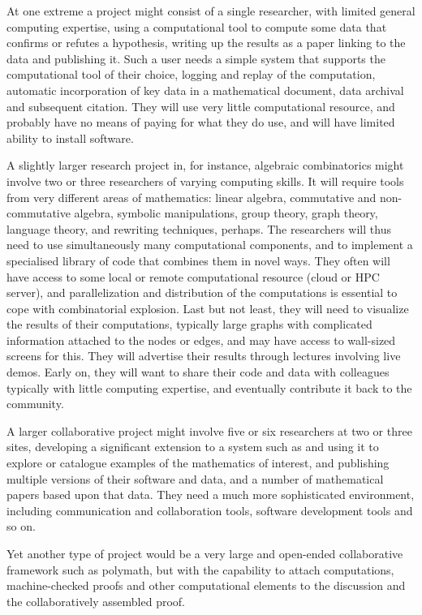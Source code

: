 \begin{compactitem}
\item At one extreme a project might consist of a single researcher, with limited
  general computing expertise, using a computational tool to compute some data
  that confirms or refutes a hypothesis, writing up the results as a paper
  linking to the data and publishing it. Such a user needs a simple system
  that supports the computational tool of their choice, logging and replay of
  the computation, automatic incorporation of key data in a mathematical
  document, data archival and subsequent citation. They will use very little
  computational resource, and probably have no means of paying for what they
  do use, and will have limited ability to install software.

\item A slightly larger research project in, for instance, algebraic
  combinatorics might involve
  two or three researchers of varying computing skills. It will
  require tools from very different areas of mathematics:
  linear algebra, commutative and non-commutative algebra, symbolic
  manipulations, group theory, graph theory, language theory, and
  rewriting techniques, perhaps. The researchers will thus need to use simultaneously many
  computational components, and to implement a specialised library of code
  that combines them in novel ways. They often will have access to
  some local or remote computational resource (cloud or HPC server),
  and parallelization and distribution of the computations is
  essential to cope with combinatorial explosion. Last but not
  least, they will need to visualize the results of their computations,
 typically large graphs
  with complicated information attached to the nodes or edges, and may have
  access to wall-sized screens for this. They will advertise their
  results through lectures involving live demos. Early on, they will
  want to share their code and data with colleagues typically with
  little computing expertise, and eventually contribute it back to the
  community.

\item A larger collaborative project might involve five or six researchers at two
  or three sites, developing a significant extension to a system such as \Sage
  and using it to explore or catalogue examples of the mathematics of
  interest, and publishing multiple versions of their software and data, and a
  number of mathematical papers based upon that data. They need a much more
  sophisticated environment, including communication and collaboration tools,
  software development tools and so on.

\item Yet another type of project would be a very large and open-ended
  collaborative framework such as polymath, but with the capability to attach
  computations, machine-checked proofs and other computational elements to the
  discussion and the collaboratively assembled proof.
\end{compactitem}

